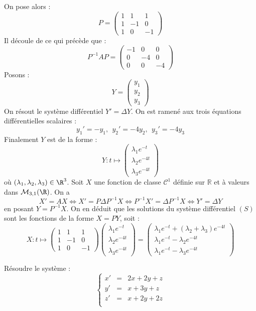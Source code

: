 \documentclass[a4paper,10pt]{report}
\begin{document}
On pose alors :
$$P = \left(\begin{array}{ccc} 1 & 1 & 1 \\ 1 & -1 & 0 \\ 1 & 0 & -1 \end{array}\right)$$
Il découle de ce qui précède que : 
$$P^{-1} A P = \left(\begin{array}{ccc} -1 & 0 & 0 \\ 0 & -4 & 0 \\ 0 & 0 & -4 \end{array}\right)$$
Posons :
$$Y = \left(\begin{array}{c} y_1 \\ y_2 \\ y_3\end{array}\right)$$
On résout le système différentiel $Y' = \Delta Y$. On est ramené aux trois équations différentielles scalaires : 
$$y_1' = -y_1, ~~ y_2' = -4 y_2 ,~~y_3' = -4 y_3$$
Finalement $Y$ est de la forme :
$$Y : t \mapsto \left(\begin{array}{c} \lambda_1 e^{-t} \\ \lambda_2 e^{-4t} \\ \lambda_3 e^{-4t}\end{array}\right)$$
où $(\lambda_1, \lambda_2, \lambda_3) \in \R^3$.
Soit $X$ une fonction de classe $\mathcal C^1$ définie sur $\mathbb R$ et à valeurs dans $\mathcal{M}_{3,1}(\R)$. On a 
$$X' = AX \iff X' = P\Delta P^{-1}X \iff P^{-1}X' = \Delta P^{-1}X \iff Y' = \Delta Y$$
en posant $Y = P^{-1}X$. On en déduit que les solutions du système différentiel $(S)$ sont les fonctions de la forme $X = PY$, soit : 
$$X : t \mapsto \left(\begin{array}{ccc} 1 & 1 & 1 \\ 1 & -1 & 0 \\ 1 & 0 & -1 \end{array}\right)\left(\begin{array}{c} \lambda_1 e^{-t} \\ \lambda_2 e^{-4t} \\ \lambda_3 e^{-4t}\end{array}\right) = \left(\begin{array}{c} \lambda_1 e^{-t} + (\lambda_2+\lambda_3)e^{-4t} \\ \lambda_1 e^{-t} - \lambda_2 e^{-4t} \\ \lambda_1 e^{-t} - \lambda_3 e^{-4t}\end{array}\right)$$

\begin{Exa} Résoudre le système :
$$ \left\lbrace \begin{array}{ccl}
x' & = &2x+2y+z \\
y' & = &x+3y+z \\
z' & =& x+2y+2z \\
\end{array}\right.$$
\end{Exa}
\end{document}
